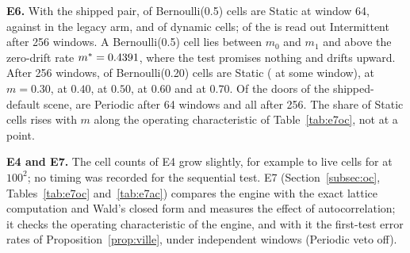 \noindent\textbf{E6.} With the shipped pair, \SqEsixShipped{} of \SqCellsAperiodic{} Bernoulli(0.5) cells are Static at window 64, against \SqEsixShippedLeg{} in the legacy arm, and \SqEsixDyn{} of \SqCellsDynamic{} dynamic cells; \SqEsixIntermittent{} of the \SqCellsAperiodic{} is read out Intermittent after 256 windows. A Bernoulli(0.5) cell lies between $m_0$ and $m_1$ and above the zero-drift rate $m^\ast=0.4391$, where the test promises nothing and drifts upward. After 256 windows, \SqEsixAtTw{} of \SqCellsAperiodic{} Bernoulli(0.20) cells are Static (\SqEsixEverTw{} at some window), \SqEsixAtThr{} at $m=0.30$, \SqEsixAtFour{} at $0.40$, \SqEsixAtHalf{} at $0.50$, \SqEsixAtSix{} at $0.60$ and \SqEsixAtSev{} at $0.70$. Of the \SqDoorsTotal{} doors of the shipped-default scene, \SqEsixDoors{} are Periodic after 64 windows and all \SqEsixDoorsLate{} after 256. The share of Static cells rises with $m$ along the operating characteristic of Table~\ref{tab:e7oc}, not at a point.

\noindent\textbf{E4 and E7.} The cell counts of E4 grow slightly, for example \SqEfourGridLeg{} to \SqEfourGrid{} live cells for  at $100^2$; no timing was recorded for the sequential test. E7 (Section~\ref{subsec:oc}, Tables~\ref{tab:e7oc} and~\ref{tab:e7ac}) compares the engine with the exact lattice computation and Wald's closed form and measures the effect of autocorrelation; it checks the operating characteristic of the engine, and with it the first-test error rates of Proposition~\ref{prop:ville}, under independent windows (Periodic veto off).
